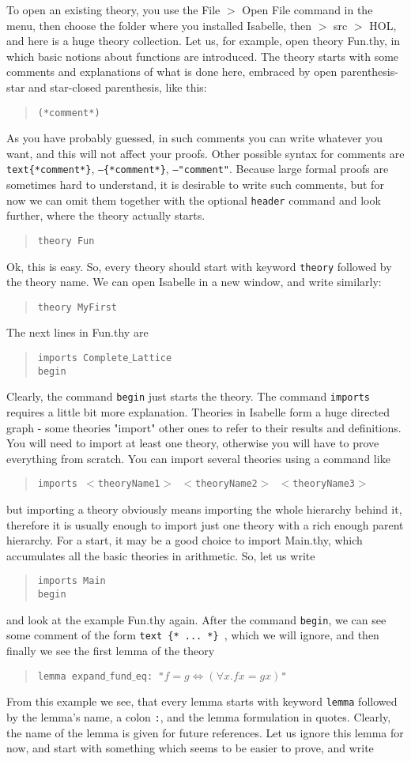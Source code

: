 \documentclass[11pt]{article}
\newcommand{\prog}[1]{\par\noindent\begin{quote}#1\end{quote}\par\noindent}
\begin{document}
To open an existing theory, you use the File $>$ Open File command in the menu, then choose the folder where you installed Isabelle, then $>$ src $>$ HOL, and here is a huge theory collection. Let us, for example, open theory Fun.thy, in which basic notions about functions are introduced. The theory starts with some comments and explanations of what is done here, embraced by open parenthesis-star and star-closed parenthesis, like this:
\prog{\tt (*comment*)}%
As you have probably guessed, in such comments you can write whatever you want, and this will not affect your proofs. Other possible syntax for comments are {\tt text\{*comment*\}}, {\tt --\{*comment*\}}, {\tt --"comment"}. Because large formal proofs are sometimes hard to understand, it is desirable to write such comments, but for now we can omit them together with the optional {\tt header} command and look further, where the theory actually starts.
\prog{\tt theory Fun}%
Ok, this is easy. So, every theory should start with keyword {\tt theory} followed by the theory name. We can open Isabelle in a new window, and write similarly:
\prog{\tt theory MyFirst}%
The next lines in Fun.thy are
\prog{\tt imports Complete$\_$Lattice\\
    begin}%
Clearly, the command {\tt begin} just starts the theory. The command {\tt imports} requires a little bit more explanation. Theories in Isabelle form a huge directed graph - some theories "import" other ones to refer to their results and definitions. You will need to import at least one theory, otherwise you will have to prove everything from scratch. You can import several theories using a command like
\prog{\tt imports $<$theoryName1$>$ $<$theoryName2$>$ $<$theoryName3$>$}%
but importing a theory obviously means importing the whole hierarchy behind it, therefore it is usually enough to import just one theory with a rich enough parent hierarchy. For a start, it may be a good choice to import Main.thy, which accumulates all the basic theories in arithmetic. So, let us write
\prog{\tt imports Main\\
    begin}%
and look at the example Fun.thy again. After the command {\tt begin}, we can see some comment of the form {\tt text \{* ... *\} }, which we will ignore, and then finally we see the first lemma of the theory
\prog{\tt lemma expand$\_$fund$\_$eq:  "$f = g \Leftrightarrow (\forall x. f x = g x)$"}%
From this example we see, that every lemma starts with keyword {\tt lemma} followed by the lemma's name, a colon {\tt :}, and the lemma formulation in quotes. Clearly, the name of the lemma is given for future references. Let us ignore this lemma for now, and start with something which seems to be easier to prove, and write
\end{document}

